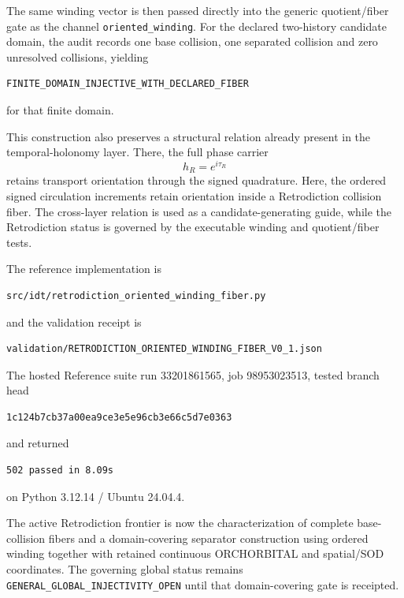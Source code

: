 The same winding vector is then passed directly into the generic quotient/fiber gate as the channel \texttt{oriented\_winding}.  For the declared two-history candidate domain, the audit records one base collision, one separated collision and zero unresolved collisions, yielding
\begin{verbatim}
FINITE_DOMAIN_INJECTIVE_WITH_DECLARED_FIBER
\end{verbatim}
for that finite domain.

This construction also preserves a structural relation already present in the temporal-holonomy layer.  There, the full phase carrier
\[
h_R=e^{i\tau_R}
\]
retains transport orientation through the signed quadrature.  Here, the ordered signed circulation increments retain orientation inside a Retrodiction collision fiber.  The cross-layer relation is used as a candidate-generating guide, while the Retrodiction status is governed by the executable winding and quotient/fiber tests.

The reference implementation is
\begin{verbatim}
src/idt/retrodiction_oriented_winding_fiber.py
\end{verbatim}
and the validation receipt is
\begin{verbatim}
validation/RETRODICTION_ORIENTED_WINDING_FIBER_V0_1.json
\end{verbatim}
The hosted Reference suite run 33201861565, job 98953023513, tested branch head
\begin{verbatim}
1c124b7cb37a00ea9ce3e5e96cb3e66c5d7e0363
\end{verbatim}
and returned
\begin{verbatim}
502 passed in 8.09s
\end{verbatim}
on Python 3.12.14 / Ubuntu 24.04.4.

The active Retrodiction frontier is now the characterization of complete base-collision fibers and a domain-covering separator construction using ordered winding together with retained continuous ORCHORBITAL and spatial/SOD coordinates.  The governing global status remains \texttt{GENERAL\_GLOBAL\_INJECTIVITY\_OPEN} until that domain-covering gate is receipted.
